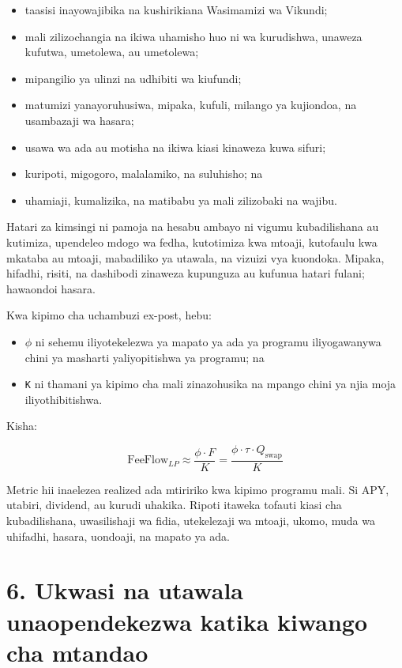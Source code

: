 \documentclass[11pt]{article}
\begin{document}
\begin{itemize}[leftmargin=*]
\item taasisi inayowajibika na kushirikiana Wasimamizi wa Vikundi;
\item mali zilizochangia na ikiwa uhamisho huo ni wa kurudishwa, unaweza kufutwa, umetolewa, au umetolewa;
\item mipangilio ya ulinzi na udhibiti wa kiufundi;
\item matumizi yanayoruhusiwa, mipaka, kufuli, milango ya kujiondoa, na usambazaji wa hasara;
\item usawa wa ada au motisha na ikiwa kiasi kinaweza kuwa sifuri;
\item kuripoti, migogoro, malalamiko, na suluhisho; na
\item uhamiaji, kumalizika, na matibabu ya mali zilizobaki na wajibu.
\end{itemize}
Hatari za kimsingi ni pamoja na hesabu ambayo ni vigumu kubadilishana au kutimiza, upendeleo mdogo wa fedha, kutotimiza kwa mtoaji, kutofaulu kwa mkataba au mtoaji, mabadiliko ya utawala, na vizuizi vya kuondoka. Mipaka, hifadhi, risiti, na dashibodi zinaweza kupunguza au kufunua hatari fulani; hawaondoi hasara.

Kwa kipimo cha uchambuzi ex-post, hebu:

\begin{itemize}[leftmargin=*]
\item \texttt{$\phi$} ni sehemu iliyotekelezwa ya mapato ya ada ya programu iliyogawanywa chini ya masharti yaliyopitishwa ya programu; na
\item \texttt{K} ni thamani ya kipimo cha mali zinazohusika na mpango chini ya njia moja iliyothibitishwa.
\end{itemize}
Kisha:

\[
\mathrm{FeeFlow}_{LP} \approx \frac{\phi \cdot F}{K} = \frac{\phi \cdot \tau \cdot Q_{\mathrm{swap}}}{K}
\]

Metric hii inaelezea realized ada mtiririko kwa kipimo programu mali. Si APY, utabiri, dividend, au kurudi uhakika. Ripoti itaweka tofauti kiasi cha kubadilishana, uwasilishaji wa fidia, utekelezaji wa mtoaji, ukomo, muda wa uhifadhi, hasara, uondoaji, na mapato ya ada.


\section*{6. Ukwasi na utawala unaopendekezwa katika kiwango cha mtandao}
\end{document}
